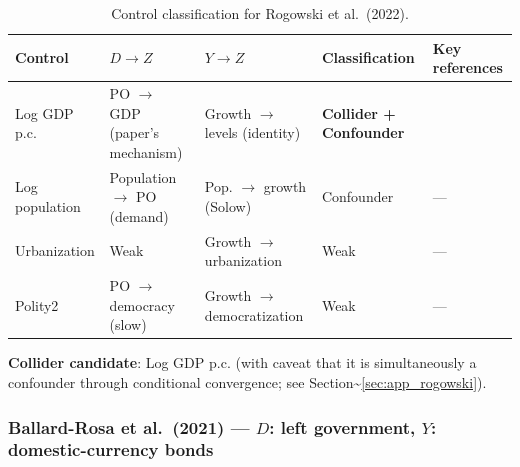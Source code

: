 \documentclass[
]{article}
\begin{document}
\begin{table}[H]
\centering
\small
\caption{Control classification for Rogowski et al.\ (2022).}
\begin{tabular}{llllp{3cm}}
\toprule
Control & $D \to Z$ & $Y \to Z$ & Classification & Key references \\
\midrule
Log GDP p.c. & PO $\to$ GDP (paper's mechanism) & Growth $\to$ levels (identity) & \textbf{Collider + Confounder} & \citet{acemoglu_etal2019} \\
Log population & Population $\to$ PO (demand) & Pop. $\to$ growth (Solow) & Confounder & --- \\
Urbanization & Weak & Growth $\to$ urbanization & Weak & --- \\
Polity2 & PO $\to$ democracy (slow) & Growth $\to$ democratization & Weak & --- \\
\bottomrule
\end{tabular}
\end{table}

\textbf{Collider candidate}: Log GDP p.c. (with caveat that it is
simultaneously a confounder through conditional convergence; see
Section\textasciitilde{}\ref{sec:app_rogowski}).

\subsubsection{\texorpdfstring{Ballard-Rosa et al.~(2021) --- \(D\):
left government, \(Y\): domestic-currency
bonds}{Ballard-Rosa et al.~(2021) --- D: left government, Y: domestic-currency bonds}}\label{ballard-rosa-et-al.-2021-d-left-government-y-domestic-currency-bonds}
\end{document}
